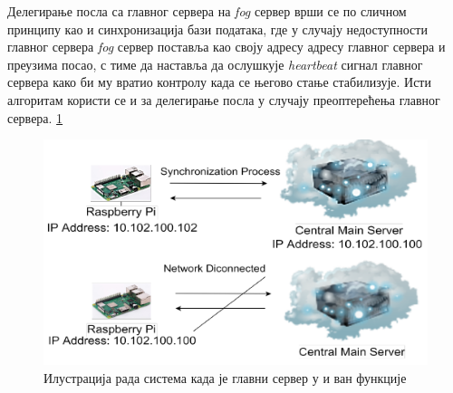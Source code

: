 Делегирање посла са главног сервера на \textit{fog} сервер врши се по сличном принципу као и синхронизација бази података, где у случају недоступности главног сервера \textit{fog} сервер поставља као своју адресу адресу главног сервера и преузима посао,  с тиме да наставља да ослушкује \textit{heartbeat} сигнал главног сервера како би му вратио контролу када се његово стање стабилизује. Исти алгоритам користи се и за делегирање посла у случају преоптерећења главног сервера. \ref{fig:ip_switching}

\begin{figure}[H]
    \centering
    \includegraphics[width=1\textwidth]{images/ip_switching.png}
    \caption{Илустрација рада система када је главни сервер у и ван функције}
    \label{fig:ip_switching}
\end{figure}